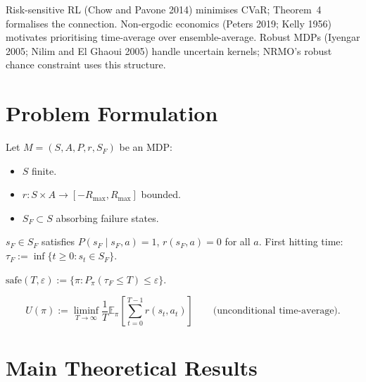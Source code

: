 Risk-sensitive RL (Chow and Pavone 2014) minimises CVaR; Theorem~4
formalises the connection. Non-ergodic economics (Peters 2019;
Kelly 1956) motivates prioritising time-average over
ensemble-average. Robust MDPs (Iyengar 2005; Nilim and El Ghaoui
2005) handle uncertain kernels; NRMO's robust chance constraint uses
this structure.

\section{Problem Formulation}
\label{sec:tf-v4-formulation}

Let $M = (S, A, P, r, S_F)$ be an MDP:

\begin{itemize}
\item $S$ finite.
\item $r: S \times A \to [-R_{\max}, R_{\max}]$ bounded.
\item $S_F \subset S$ absorbing failure states.
\end{itemize}

\begin{definition}
\label{def:failure-absorption}
$s_F \in S_F$ satisfies $P(s_F \mid s_F, a) = 1$, $r(s_F, a) = 0$
for all $a$. First hitting time:
$\tau_F := \inf\{t \ge 0 : s_t \in S_F\}$.
\end{definition}

\begin{definition}
\label{def:safe-policy}
$\mathrm{safe}(T, \varepsilon) := \{\pi : P_\pi(\tau_F \le T) \le
\varepsilon\}$.
\end{definition}

\begin{definition}
\label{def:tf-v4-objective}
\begin{equation}
U(\pi) := \liminf_{T \to \infty} \frac{1}{T}
\mathbb{E}_\pi\!\left[
\sum_{t=0}^{T-1} r(s_t, a_t)
\right] \qquad \text{(unconditional time-average).}
\end{equation}
\end{definition}

\section{Main Theoretical Results}
\label{sec:tf-v4-main-results}

